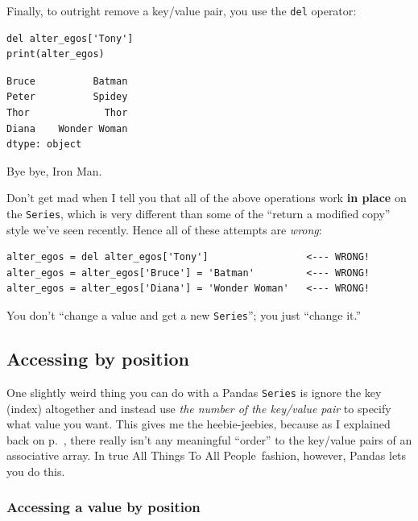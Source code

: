 \label{delOp}

Finally, to outright remove a key/value pair, you use the \texttt{del}
operator:

\begin{Verbatim}[fontsize=\small,samepage=true,frame=single,framesep=3mm]
del alter_egos['Tony']
print(alter_egos)
\end{Verbatim}

\begin{Verbatim}[fontsize=\small,samepage=true,frame=leftline,framesep=5mm,framerule=1mm]
Bruce          Batman
Peter          Spidey
Thor             Thor
Diana    Wonder Woman
dtype: object
\end{Verbatim}

Bye bye, Iron Man.


Don't get mad when I tell you that all of the above operations work
\textbf{in place} on the \texttt{Series}, which is very different than some of
the ``return a modified copy'' style we've seen recently. Hence all of these
attempts are \textit{wrong}:

\begin{Verbatim}[fontsize=\footnotesize,samepage=true,frame=single,framesep=3mm]
alter_egos = del alter_egos['Tony']                 <--- WRONG!
alter_egos = alter_egos['Bruce'] = 'Batman'         <--- WRONG!
alter_egos = alter_egos['Diana'] = 'Wonder Woman'   <--- WRONG!
\end{Verbatim}

You don't ``change a value and get a new \texttt{Series}''; you just
``change it.''

\subsection{Accessing by position}


One slightly weird thing you can do with a Pandas \texttt{Series} is ignore the
key (index) altogether and instead use \textit{the number of the key/value
pair} to specify what value you want. This gives me the heebie-jeebies, because
as I explained back on p.~\pageref{assocArraysUnordered}, there really isn't
any meaningful ``order'' to the key/value pairs of an associative array. In
true All Things To All People\texttrademark~fashion, however, Pandas lets you
do this.

\subsubsection{Accessing a value by position}

